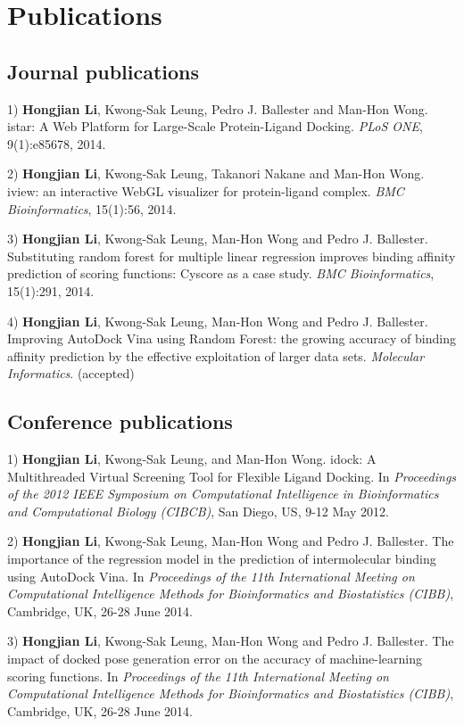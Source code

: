 \chapter{Publications}

\section{Journal publications}

1) \textbf{Hongjian Li}, Kwong-Sak Leung, Pedro J. Ballester and Man-Hon Wong. istar: A Web Platform for Large-Scale Protein-Ligand Docking. \textit{PLoS ONE}, 9(1):e85678, 2014.

2) \textbf{Hongjian Li}, Kwong-Sak Leung, Takanori Nakane and Man-Hon Wong. iview: an interactive WebGL visualizer for protein-ligand complex. \textit{BMC Bioinformatics}, 15(1):56, 2014.

3) \textbf{Hongjian Li}, Kwong-Sak Leung, Man-Hon Wong and Pedro J. Ballester. Substituting random forest for multiple linear regression improves binding affinity prediction of scoring functions: Cyscore as a case study. \textit{BMC Bioinformatics}, 15(1):291, 2014.

4) \textbf{Hongjian Li}, Kwong-Sak Leung, Man-Hon Wong and Pedro J. Ballester. Improving AutoDock Vina using Random Forest: the growing accuracy of binding affinity prediction by the effective exploitation of larger data sets. \textit{Molecular Informatics}. (accepted)

\section{Conference publications}

1) \textbf{Hongjian Li}, Kwong-Sak Leung, and Man-Hon Wong. idock: A Multithreaded Virtual Screening Tool for Flexible Ligand Docking. In \textit{Proceedings of the 2012 IEEE Symposium on Computational Intelligence in Bioinformatics and Computational Biology (CIBCB)}, San Diego, US, 9-12 May 2012.

2) \textbf{Hongjian Li}, Kwong-Sak Leung, Man-Hon Wong and Pedro J. Ballester. The importance of the regression model in the prediction of intermolecular binding using AutoDock Vina. In \textit{Proceedings of the 11th International Meeting on Computational Intelligence Methods for Bioinformatics and Biostatistics (CIBB)}, Cambridge, UK, 26-28 June 2014.

3) \textbf{Hongjian Li}, Kwong-Sak Leung, Man-Hon Wong and Pedro J. Ballester. The impact of docked pose generation error on the accuracy of machine-learning scoring functions. In \textit{Proceedings of the 11th International Meeting on Computational Intelligence Methods for Bioinformatics and Biostatistics (CIBB)}, Cambridge, UK, 26-28 June 2014.

